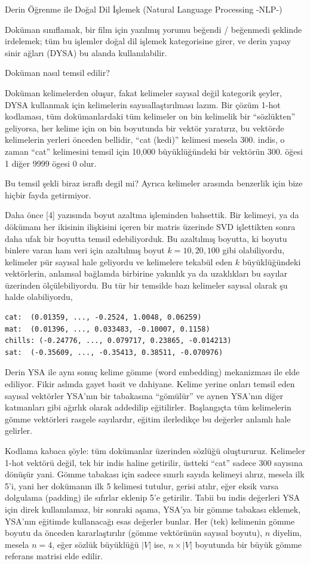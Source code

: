 \documentclass[12pt,fleqn]{article}\usepackage{../../common}
\begin{document}
Derin Öğrenme ile Doğal Dil İşlemek (Natural Language Processing -NLP-)

Doküman sınıflamak, bir film için yazılmış yorumu beğendi / beğenmedi
şeklinde irdelemek; tüm bu işlemler doğal dil işlemek kategorisine girer,
ve derin yapay sinir ağları (DYSA) bu alanda kullanılabilir.

Doküman nasıl temsil edilir? 

Doküman kelimelerden oluşur, fakat kelimeler sayısal değil kategorik
şeyler, DYSA kullanmak için kelimelerin sayısallaştırılması lazım. Bir
çözüm 1-hot kodlaması, tüm dokümanlardaki tüm kelimeler on bin kelimelik
bir ``sözlükten'' geliyorsa, her kelime için on bin boyutunda bir vektör
yaratırız, bu vektörde kelimelerin yerleri önceden bellidir, ``cat (kedi)''
kelimesi mesela 300. indis, o zaman ``cat'' kelimesini temsil için 10,000
büyüklüğündeki bir vektörün 300. öğesi 1 diğer 9999 ögesi 0 olur.

Bu temsil şekli biraz israflı degil mi? Ayrıca kelimeler arasında benzerlik
için bize hiçbir fayda getirmiyor.

Daha önce [4] yazısında boyut azaltma işleminden bahsettik. Bir kelimeyi,
ya da dökümanı her ikisinin ilişkisini içeren bir matris üzerinde SVD
işlettikten sonra daha ufak bir boyutta temsil edebiliyorduk. Bu azaltılmış
boyutta, ki boyutu binlere varan ham veri için azaltılmış boyut
$k=10,20,100$ gibi olabiliyordu, kelimeler pür sayısal hale geliyordu ve
kelimelere tekabül eden $k$ büyüklüğündeki vektörlerin, anlamsal bağlamda
birbirine yakınlık ya da uzaklıkları bu sayılar üzerinden
ölçülebiliyordu. Bu tür bir temsilde bazı kelimeler sayısal olarak şu halde
olabiliyordu,

\begin{verbatim}
cat:  (0.01359, ..., -0.2524, 1.0048, 0.06259)
mat:  (0.01396, ..., 0.033483, -0.10007, 0.1158)
chills: (-0.24776, ..., 0.079717, 0.23865, -0.014213)
sat:  (-0.35609, ..., -0.35413, 0.38511, -0.070976)
\end{verbatim}

Derin YSA ile aynı sonuç kelime gömme (word embedding) mekanizması ile elde
ediliyor. Fikir aslında gayet basit ve dahiyane. Kelime yerine onları
temsil eden sayısal vektörler YSA'nın bir tabakasına ``gömülür'' ve aynen
YSA'nın diğer katmanları gibi ağırlık olarak addedilip
eğitilirler. Başlangıçta tüm kelimelerin gömme vektörleri rasgele
sayılardır, eğitim ilerledikçe bu değerler anlamlı hale gelirler.

Kodlama kabaca şöyle: tüm dokümanlar üzerinden sözlüğü oluştururuz.
Kelimeler 1-hot vektörü değil, tek bir indis haline getirilir, üstteki
``cat'' sadece 300 sayısına dönüşür yani. Gömme tabakası için sadece
sınırlı sayıda kelimeyi alırız, mesela ilk 5'i, yani her dokümanın ilk 5
kelimesi tutulur, gerisi atılır, eğer eksik varsa dolgulama (padding) ile
sıfırlar eklenip 5'e getirilir. Tabii bu indis değerleri YSA için direk
kullanılamaz, bir sonraki aşama, YSA'ya bir gömme tabakası eklemek, YSA'nın
eğitimde kullanacağı esas değerler bunlar. Her (tek) kelimenin gömme boyutu
da önceden kararlaştırılır (gömme vektörünün sayısal boyutu), $n$ diyelim,
mesela $n=4$, eğer sözlük büyüklüğü $|V|$ ise, $n \times |V|$ boyutunda bir
büyük gömme referans matrisi elde edilir. 
\end{document}
